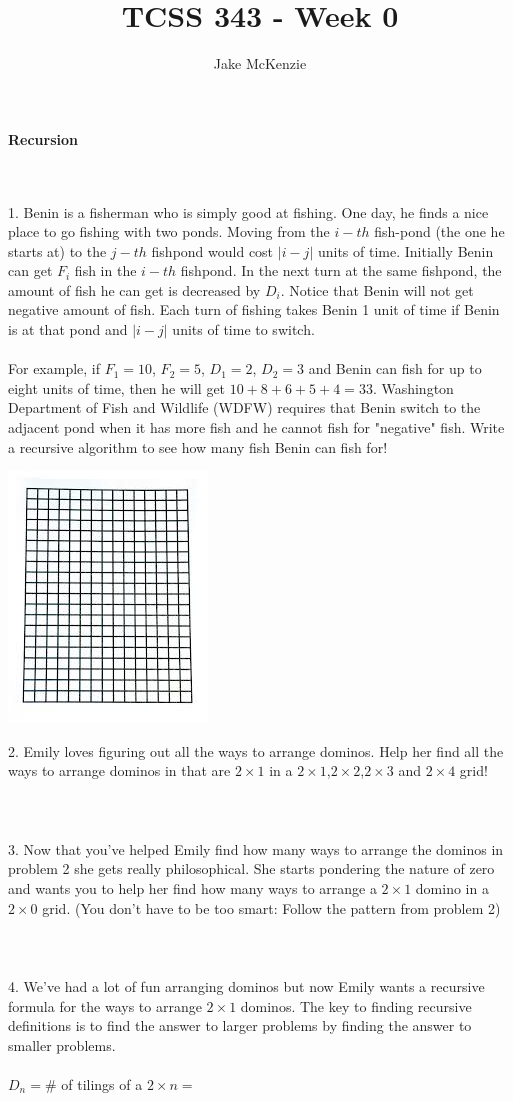 \documentclass[12pt]{article}
\begin{document}
\title{TCSS 343 - Week 0}
\author{Jake McKenzie}
\maketitle
\noindent\centerline{\textbf{Recursion}}\\\\
1. Benin is a fisherman who is simply good at fishing. One day, he finds a nice place to go fishing with two ponds. 
Moving from the $i-th$ fish-pond (the one he starts at) to the $j-th$ fishpond would cost $|i - j|$ units of time. 
Initially Benin can get $F_i$ fish in the $i-th$ fishpond. 
In the next turn at the same fishpond, the amount of fish he can get is decreased by $D_i$. 
Notice that Benin will not get negative amount of fish.
Each turn of fishing takes Benin 1 unit of time if Benin is at that pond and $|i - j|$ units of time to switch.
\\\\
For example, if $F_1 = 10$, $F_2 = 5$, $D_1 = 2$, $D_2 = 3$ and Benin can fish for up to eight units of time, then he will get $10 + 8 + 6 + 5 + 4 = 33$.
Washington Department of Fish and Wildlife (WDFW) requires that Benin switch to the adjacent pond when it has more fish and he cannot fish for "negative" fish.
Write a recursive algorithm to see how many fish Benin can fish for!
\newpage
\centerline{\includegraphics[angle = 90]{grid.jpg}}
2. Emily loves figuring out all the ways to arrange dominos. Help her find all the ways to arrange dominos in that are $2 \times 1$ in a $2 \times 1$,$2 \times 2$,$2 \times 3$ and $2 \times 4$ grid!\\\\\\\\
3. Now that you've helped Emily find how many ways to arrange the dominos in problem 2 she gets really philosophical. She starts pondering the nature of zero and wants you to help her find how many ways to arrange a $2 \times 1$ domino in a $2 \times 0$ grid. (You don't have to be too smart: Follow the pattern from problem 2)\\\\\\\\
4. We've had a lot of fun arranging dominos but now Emily wants a recursive formula for the ways to arrange $2 \times 1$ dominos. The key to finding recursive definitions is to find the answer to larger problems by finding the answer to smaller problems.\\\\
$D_n = $\# of tilings of a $2 \times n =$
\end{document}
